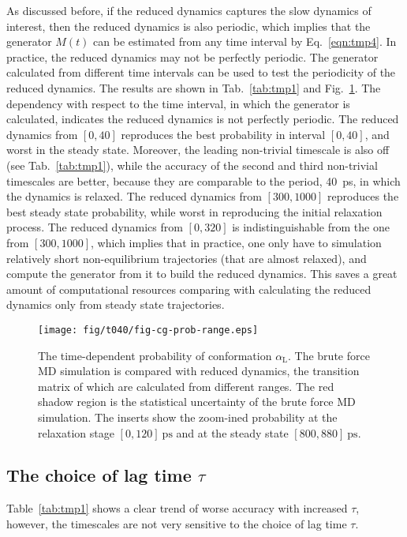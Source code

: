 \documentclass[aps, pre, preprint,unsortedaddress,a4paper,onecolumn]{revtex4}
\newcommand{\redc}[1]{{\color{red} #1}}
\newcommand{\confc}[0]{{\alpha_{\textrm{L}}}}
\begin{document}
As discussed before, if the reduced dynamics captures the slow
dynamics of interest, then the reduced dynamics is also periodic,
which implies that the generator $M(t)$ can be estimated from any time
interval by Eq.~\eqref{eqn:tmp4}. In practice, the reduced dynamics
may not be perfectly periodic. The generator calculated from
different time intervals can be used to test the periodicity of the
reduced dynamics. The results are shown in Tab.~\ref{tab:tmp1} and
Fig.~\ref{fig:tmp2}.  The dependency with respect to the time
interval, in which the generator is calculated, indicates the reduced
dynamics is not perfectly periodic. The reduced dynamics from $[0,40]$
reproduces the best probability in interval $[0,40]$, and worst in the
steady state. Moreover, the leading non-trivial timescale is also off
(see Tab.~\ref{tab:tmp1}), while the accuracy of the second and third
non-trivial timescales are better, because they are comparable to the
period, 40~ps, in which the dynamics is relaxed. The reduced dynamics
from $[300,1000]$ reproduces the best steady state probability, while
worst in reproducing the initial relaxation process. The reduced
dynamics from $[0,320]$ is indistinguishable from the one from
$[300,1000]$, which implies that in practice, one only have to
simulation relatively short non-equilibrium trajectories (that are
almost relaxed), and compute the generator from it to build the reduced dynamics. \redc{This saves a great
amount of computational resources comparing with calculating the
reduced dynamics only from steady state trajectories.}


\begin{figure}
  \centering
  \texttt{[image: fig/t040/fig-cg-prob-range.eps]}  
  \caption{The time-dependent probability of conformation
    $\confc$. The brute force MD simulation is compared with reduced
    dynamics, the transition matrix of which are calculated from
    different ranges. The red shadow region is the statistical uncertainty of the brute force MD simulation.
    The inserts show the zoom-ined probability at the relaxation stage $[0,120 ]~\textrm{ps}$ and at the steady state $[800,880 ]~\textrm{ps}$.}
  \label{fig:tmp2}
\end{figure}

\subsection{The choice of lag time $\tau$}
Table~\ref{tab:tmp1} shows a clear trend of worse accuracy with
increased $\tau$, however, the timescales are not very sensitive to
the choice of lag time $\tau$.
\end{document}

